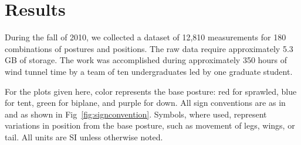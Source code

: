 \section{Results}
During the fall of 2010, we collected a dataset of 12,810 measurements for 180 combinations of postures and positions.  The raw data require approximately 5.3 GB of storage.  The work was accomplished during approximately 350 hours of wind tunnel time by a team of ten undergraduates led by one graduate student.

For the plots given here, color represents the base posture: red for sprawled, blue for tent, green for biplane, and purple for down.  All sign conventions are as in \citep{McCay:2001} and as shown in Fig~\ref{fig:signconvention}.  Symbols, where used, represent variations in position from the base posture, such as movement of legs, wings, or tail. All units are SI unless otherwise noted. 



